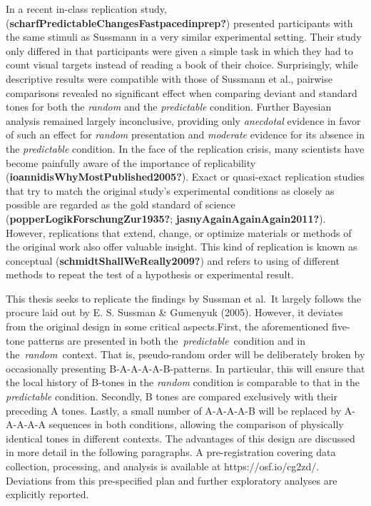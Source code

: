 \documentclass[twoside, man, a4paper,12pt, nofontenc]{apa7}
\begin{document}
In a recent in-class replication study,
(\textbf{scharfPredictableChangesFastpacedinprep?}) presented
participants with the same stimuli as Sussmann in a very similar
experimental setting. Their study only differed in that participants
were given a simple task in which they had to count visual targets
instead of reading a book of their choice. Surprisingly, while
descriptive results were compatible with those of Sussmann et al.,
pairwise comparisons revealed no significant effect when comparing
deviant and standard tones for both the \emph{random} and the
\emph{predictable} condition. Further Bayesian analysis remained largely
inconclusive, providing only \emph{anecdotal} evidence in favor of such
an effect for \emph{random} presentation and \emph{moderate} evidence
for its absence in the \emph{predictable} condition. In the face of the
replication crisis, many scientists have become painfully aware of the
importance of replicability (\textbf{ioannidisWhyMostPublished2005?}).
Exact or quasi-exact replication studies that try to match the original
study's experimental conditions as closely as possible are regarded as
the gold standard of science (\textbf{popperLogikForschungZur1935?};
\textbf{jasnyAgainAgainAgain2011?}). However, replications that extend,
change, or optimize materials or methods of the original work also offer
valuable insight. This kind of replication is known as conceptual
(\textbf{schmidtShallWeReally2009?}) and refers to using of different
methods to repeat the test of a hypothesis or experimental result.

This thesis seeks to replicate the findings by Sussman et al.~It largely
follows the procure laid out by E. S. Sussman \& Gumenyuk (2005).
However, it deviates from the original design in some critical
aspects.First, the aforementioned five-tone patterns are presented in
both the~\emph{predictable}~condition and in the~\emph{random}~context.
That is, pseudo-random order will be deliberately broken by occasionally
presenting B-A-A-A-A-B-patterns. In particular, this will ensure that
the local history of B-tones in the \emph{random} condition is
comparable to that in the \emph{predictable} condition. Secondly, B
tones are compared exclusively with their preceding A tones. Lastly, a
small number of A-A-A-A-B will be replaced by A-A-A-A-A sequences in
both conditions, allowing the comparison of physically identical tones
in different contexts. The advantages of this design are discussed in
more detail in the following paragraphs. A pre-registration covering
data collection, processing, and analysis is available at
https://osf.io/cg2zd/. Deviations from this pre-specified plan and
further exploratory analyses are explicitly reported.
\end{document}
